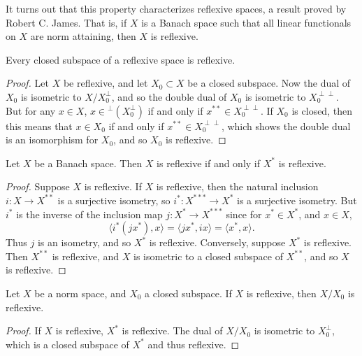 It turns out that this property characterizes reflexive spaces, a result proved by Robert C. James. That is, if $X$ is a Banach space such that all linear functionals on $X$ are norm attaining, then $X$ is reflexive.

\begin{theorem}
    Every closed subspace of a reflexive space is reflexive.
\end{theorem}
\begin{proof}
    Let $X$ be reflexive, and let $X_0 \subset X$ be a closed subspace. Now the dual of $X_0$ is isometric to $X / X_0^\perp$, and so the double dual of $X_0$ is isometric to $X_0^{\perp \perp}$. But  for any $x \in X$, $x \in {}^{\perp} (X_0^\perp)$ if and only if $x^{**} \in X_0^{\perp \perp}$. If $X_0$ is closed, then this means that $x \in X_0$ if and only if $x^{**} \in X_0^{\perp \perp}$, which shows the double dual is an isomorphism for $X_0$, and so $X_0$ is reflexive.
\end{proof}

\begin{corollary}
    Let $X$ be a Banach space. Then $X$ is reflexive if and only if $X^*$ is reflexive.
\end{corollary}
\begin{proof}
    Suppose $X$ is reflexive. If $X$ is reflexive, then the natural inclusion $i: X \to X^{**}$ is a surjective isometry, so $i^*: X^{***} \to X^*$ is a surjective isometry. But $i^*$ is the inverse of the inclusion map $j: X^* \to X^{***}$ since for $x^* \in X^*$, and $x \in X$,
    \[ \langle i^*(j x^*), x \rangle = \langle j x^*, i x \rangle = \langle x^*, x \rangle. \]
    Thus $j$ is an isometry, and so $X^*$ is reflexive. Conversely, suppose $X^*$ is reflexive. Then $X^{**}$ is reflexive, and $X$ is isometric to a closed subspace of $X^{**}$, and so $X$ is reflexive.
\end{proof}

\begin{corollary}
    Let $X$ be a norm space, and $X_0$ a closed subspace. If $X$ is reflexive, then $X / X_0$ is reflexive.
\end{corollary}
\begin{proof}
    If $X$ is reflexive, $X^*$ is reflexive. The dual of $X / X_0$ is isometric to $X_0^\perp$, which is a closed subspace of $X^*$ and thus reflexive.
\end{proof}

